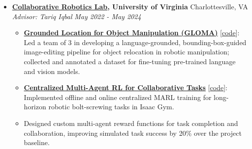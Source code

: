 \documentclass[letterpaper,11pt]{article}
\newcommand{\linkhref}[2]{\textcolor{linkblue}{\href{#1}{#2}}}
\newcommand{\Date}[1]{\textit{\small #1}}
\newcommand{\heading}[4]{
  \textbf{#1} \hfill #2 \\
  \textit{\small#3} \hfill \Date{#4}
}
\begin{document}
\begin{itemize}[label={}, leftmargin=0pt]
    \item \heading{\href{https://www.collabrobotics.com/}{Collaborative Robotics Lab}, University of Virginia}{Charlottesville, VA}
          {Advisor: Tariq Iqbal}{May 2022 - May 2024}
          \begin{itemize}
              \item \textbf{\href{https://github.com/branyang02/GLOMA}{Grounded Location for Object Manipulation (GLOMA)}} [\linkhref{https://github.com/branyang02/GLOMA}{code}]: Led a team of 3 in developing a language-grounded, bounding-box-guided image-editing pipeline for object relocation in robotic manipulation; collected and annotated a dataset for fine-tuning pre-trained language and vision models.
              \item \textbf{\href{https://github.com/branyang02/PandaFactory}{Centralized Multi-Agent RL for Collaborative Tasks}} [\linkhref{https://github.com/branyang02/PandaFactory}{code}]: Implemented offline and online centralized MARL training for long-horizon robotic bolt-screwing tasks in Isaac Gym.
              \item Designed custom multi-agent reward functions for task completion and collaboration, improving simulated task success by 20\% over the project baseline.
          \end{itemize}
\end{itemize}
\end{document}
